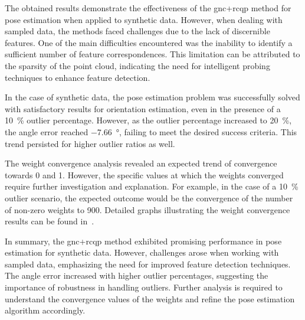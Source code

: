 The obtained results demonstrate the effectiveness of the \gls{gnc}+\gls{rcqp} method for pose estimation when applied to synthetic data. However, when dealing with sampled data, the methods faced challenges due to the lack of discernible features. One of the main difficulties encountered was the inability to identify a sufficient number of feature correspondences. This limitation can be attributed to the sparsity of the point cloud, indicating the need for intelligent probing techniques to enhance feature detection. \medskip

In the case of synthetic data, the pose estimation problem was successfully solved with satisfactory results for orientation estimation, even in the presence of a \SI{10}{\percent} outlier percentage. However, as the outlier percentage increased to \SI{20}{\percent}, the angle error reached \SI{-7.66}{\degree}, failing to meet the desired success criteria. This trend persisted for higher outlier ratios as well. \medskip

The weight convergence analysis revealed an expected trend of convergence towards 0 and 1. However, the specific values at which the weights converged require further investigation and explanation. For example, in the case of a \SI{10}{\percent} outlier scenario, the expected outcome would be the convergence of the number of non-zero weights to \num{900}. Detailed graphs illustrating the weight convergence results can be found in~.\medskip

In summary, the \gls{gnc}+\gls{rcqp} method exhibited promising performance in pose estimation for synthetic data. However, challenges arose when working with sampled data, emphasizing the need for improved feature detection techniques. The angle error increased with higher outlier percentages, suggesting the importance of robustness in handling outliers. Further analysis is required to understand the convergence values of the weights and refine the pose estimation algorithm accordingly.